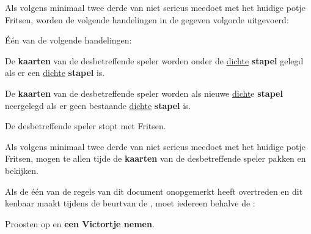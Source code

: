 
\vervolgLijst{}
\item Als \eenSpeler volgens minimaal twee derde van \alleSpelers niet serieus meedoet met het huidige potje Fritsen, worden de volgende handelingen in de gegeven volgorde uitgevoerd:
\numeriekeLijst{}
\item Één van de volgende handelingen:
\puntLijst{}
\item De \textbf{kaarten} van de desbetreffende speler worden onder de \ul{dichte} \textbf{stapel} gelegd als er een \ul{dichte} \textbf{stapel} is.
\item De \textbf{kaarten} van de desbetreffende speler worden als nieuwe \ul{dicht}e \textbf{stapel} neergelegd als er geen bestaande \ul{dichte} \textbf{stapel} is.
\eindPuntLijst{}
\item De desbetreffende speler stopt met Fritsen.
\eindNumeriekeLijst{}
\eindLijst{}

\vervolgLijst{}
\item Als \eenSpeler volgens minimaal twee derde van \alleSpelers niet serieus meedoet met het huidige potje Fritsen, mogen \alleSpelers te allen tijde de \textbf{kaarten} van de desbetreffende speler pakken en bekijken.
\eindLijst{}


\vervolgLijst{}
\item Als de \vorigeSpeler één van de regels van dit document onopgemerkt heeft overtreden en dit kenbaar maakt tijdens de beurt\footnotemark[1] van de \huidigeSpelerN, moet iedereen behalve de \vorigeSpelerN:
\puntLijst{}
\item Proosten op  en \textbf{een Victortje nemen}\footnotemark[2].
\eindPuntLijst{}
\eindLijst{}


\newpage
{}
\label{sec:beginfase_start}


